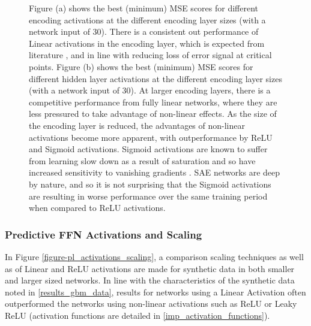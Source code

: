 \documentclass[a4paper,11pt,oneside]{article}
\theoremstyle{plain}
\theoremstyle{definition}
\begin{document}
\begin{figure}[H]
{		\newline Figure (a) shows the best (minimum) MSE scores for different encoding activations at the different encoding layer sizes (with a network input of 30). There is a consistent out performance of Linear activations in the encoding layer, which is expected from literature \cite{Hinton2}, and in line with reducing loss of error signal at critical points. 
		\newline Figure (b) shows the best (minimum) MSE scores for different hidden layer activations at the different encoding layer sizes (with a network input of 30). At larger encoding layers, there is a competitive performance from fully linear networks, where they are less pressured to take advantage of non-linear effects. As the size of the encoding layer is reduced, the advantages of non-linear activations become more apparent, with outperformance by ReLU and Sigmoid activations. Sigmoid activations are known to suffer from learning slow down as a result of saturation and so have increased sensitivity to vanishing gradients \cite{Glorot2}. SAE networks are deep by nature, and so it is not surprising that the Sigmoid activations are resulting in worse performance over the same training period when compared to ReLU activations. \newline}
	\label{figure-mse_encoding_activations}
\end{figure}


\subsubsection{Predictive FFN Activations and Scaling}

In Figure \ref{figure-pl_activations_scaling}, a comparison scaling techniques as well as of Linear and ReLU activations are made for synthetic data in both smaller and larger sized networks. In line with the characteristics of the synthetic data noted in \ref{results_gbm_data}, results for networks using a Linear Activation often outperformed the networks using non-linear activations such as ReLU or Leaky ReLU (activation functions are detailed in \ref{imp_activation_functions}). \newline
\end{document}
